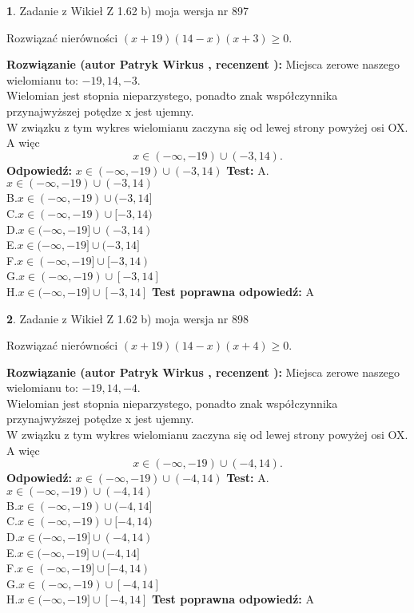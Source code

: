 \documentclass[12pt, a4paper]{article}
\theoremstyle{definition} %
\newtheorem{zad}{}
\newcommand{\zadStart}[1]{\begin{zad}#1\newline}
\newcommand{\zadStop}{\end{zad}}
\newcommand{\rozwStart}[2]{\noindent \textbf{Rozwiązanie (autor #1 , recenzent #2): }\newline}
\newcommand{\rozwStop}{\newline}
\newcommand{\odpStart}{\noindent \textbf{Odpowiedź:}\newline}
\newcommand{\odpStop}{\newline}
\newcommand{\testStart}{\noindent \textbf{Test:}\newline}
\newcommand{\testStop}{\newline}
\newcommand{\kluczStart}{\noindent \textbf{Test poprawna odpowiedź:}\newline}
\newcommand{\kluczStop}{\newline}
\begin{document}
\zadStart{Zadanie z Wikieł Z 1.62 b) moja wersja nr 897}

Rozwiązać nierówności $(x+19)(14-x)(x+3)\ge0$.
\zadStop
\rozwStart{Patryk Wirkus}{}
Miejsca zerowe naszego wielomianu to: $-19, 14, -3$.\\
Wielomian jest stopnia nieparzystego, ponadto znak współczynnika przy\linebreak najwyższej potędze x jest ujemny.\\ W związku z tym wykres wielomianu zaczyna się od lewej strony powyżej osi OX. A więc $$x \in (-\infty,-19) \cup (-3,14).$$
\rozwStop
\odpStart
$x \in (-\infty,-19) \cup (-3,14)$
\odpStop
\testStart
A.$x \in (-\infty,-19) \cup (-3,14)$\\
B.$x \in (-\infty,-19) \cup (-3,14]$\\
C.$x \in (-\infty,-19) \cup [-3,14)$\\
D.$x \in (-\infty,-19] \cup (-3,14)$\\
E.$x \in (-\infty,-19] \cup (-3,14]$\\
F.$x \in (-\infty,-19] \cup [-3,14)$\\
G.$x \in (-\infty,-19) \cup [-3,14]$\\
H.$x \in (-\infty,-19] \cup [-3,14]$
\testStop
\kluczStart
A
\kluczStop



\zadStart{Zadanie z Wikieł Z 1.62 b) moja wersja nr 898}

Rozwiązać nierówności $(x+19)(14-x)(x+4)\ge0$.
\zadStop
\rozwStart{Patryk Wirkus}{}
Miejsca zerowe naszego wielomianu to: $-19, 14, -4$.\\
Wielomian jest stopnia nieparzystego, ponadto znak współczynnika przy\linebreak najwyższej potędze x jest ujemny.\\ W związku z tym wykres wielomianu zaczyna się od lewej strony powyżej osi OX. A więc $$x \in (-\infty,-19) \cup (-4,14).$$
\rozwStop
\odpStart
$x \in (-\infty,-19) \cup (-4,14)$
\odpStop
\testStart
A.$x \in (-\infty,-19) \cup (-4,14)$\\
B.$x \in (-\infty,-19) \cup (-4,14]$\\
C.$x \in (-\infty,-19) \cup [-4,14)$\\
D.$x \in (-\infty,-19] \cup (-4,14)$\\
E.$x \in (-\infty,-19] \cup (-4,14]$\\
F.$x \in (-\infty,-19] \cup [-4,14)$\\
G.$x \in (-\infty,-19) \cup [-4,14]$\\
H.$x \in (-\infty,-19] \cup [-4,14]$
\testStop
\kluczStart
A
\kluczStop
\end{document}
